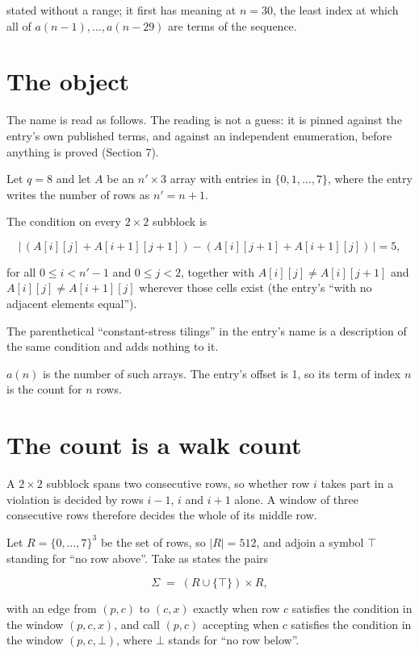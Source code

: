 \documentclass[11pt]{article}
\theoremstyle{definition}
\begin{document}
stated without a range; it first has meaning at $n = 30$, the least index at which all of $a(n-1),\dots,a(n-29)$ are terms of the sequence.

\section{The object}

The name is read as follows. The reading is not a guess: it is pinned against the entry's own published terms, and against an independent enumeration, before anything is proved (Section 7).

Let $q = 8$ and let $A$ be an $n' \times 3$ array with entries in $\{0,1,\dots,7\}$, where the entry writes the number of rows as $n' = n + 1$.

The condition on every $2 \times 2$ subblock is

\[\bigl|\,(A[i][j] + A[i{+}1][j{+}1]) - (A[i][j{+}1] + A[i{+}1][j])\,\bigr| = 5,\]

for all $0 \le i < n'-1$ and $0 \le j < 2$, together with $A[i][j] \ne A[i][j{+}1]$ and $A[i][j] \ne A[i{+}1][j]$ wherever those cells exist (the entry's ``with no adjacent elements equal'').

The parenthetical ``constant-stress tilings'' in the entry's name is a description of the same condition and adds nothing to it.

$a(n)$ is the number of such arrays. The entry's offset is 1, so its term of index $n$ is the count for $n$ rows.

\section{The count is a walk count}

A $2 \times 2$ subblock spans two consecutive rows, so whether row $i$ takes part in a violation is decided by rows $i-1$, $i$ and $i+1$ alone. A window of three consecutive rows therefore decides the whole of its middle row.

Let $R = \{0,\dots,7\}^{3}$ be the set of rows, so $|R| = 512$, and adjoin a symbol $\top$ standing for ``no row above''. Take as states the pairs

\[\Sigma \;=\; (R \cup \{\top\}) \times R,\]

with an edge from $(p,c)$ to $(c,x)$ exactly when row $c$ satisfies the condition in the window $(p,c,x)$, and call $(p,c)$ accepting when $c$ satisfies the condition in the window $(p,c,\bot)$, where $\bot$ stands for ``no row below''.
\end{document}
